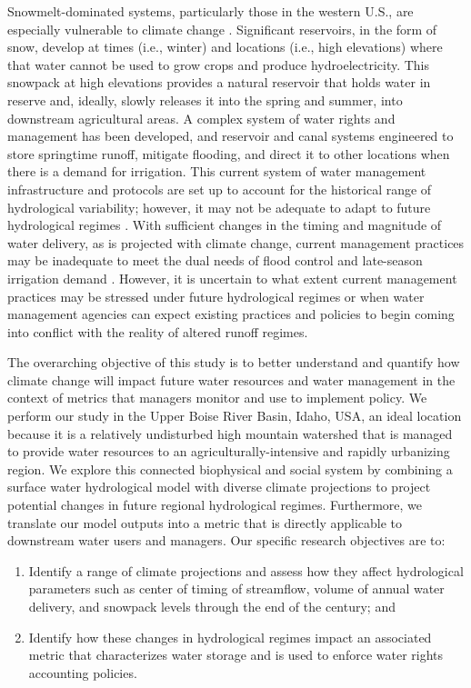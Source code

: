 \documentclass[water,article,submit,moreauthors,pdftex,10pt,a4paper]{mdpi}
\theoremstyle{mdpi}
\newcounter{ex}
\newcounter{re}
\theoremstyle{mdpidefinition}
\begin{document}
Snowmelt-dominated systems, particularly those in the western U.S., are especially vulnerable to climate change \citep{Barnett:2005ci,Stewart:2009jn,Li:2017jn}. Significant reservoirs, in the form of snow, develop at times (i.e., winter) and locations (i.e., high elevations) where that water cannot be used to grow crops and produce hydroelectricity. This snowpack at high elevations provides a natural reservoir that holds water in reserve and, ideally, slowly releases it into the spring and summer, into downstream agricultural areas. A complex system of water rights and management has been developed, and reservoir and canal systems engineered to store springtime runoff, mitigate flooding, and direct it to other locations when there is a demand for irrigation. This current system of water management infrastructure and protocols are set up to account for the historical range of hydrological variability; however, it may not be adequate to adapt to future hydrological regimes \citep{Palmer:2008dv}. With sufficient changes in the timing and magnitude of water delivery, as is projected with climate change, current management practices may be inadequate to meet the dual needs of flood control and late-season irrigation demand \citep{Barnett:2005ci}. However, it is uncertain to what extent current management practices may be stressed under future hydrological regimes or when water management agencies can expect existing practices and policies to begin coming into conflict with the reality of altered runoff regimes. 

The overarching objective of this study is to better understand and quantify how climate change will impact future water resources and water management in the context of metrics that managers monitor and use to implement policy. We perform our study in the Upper Boise River Basin, Idaho, USA, an ideal location because it is a relatively undisturbed high mountain watershed that is managed to provide water resources to an agriculturally-intensive and rapidly urbanizing region. We explore this connected biophysical and social system by combining a surface water hydrological model with diverse climate projections to project potential changes in future regional hydrological regimes. Furthermore, we translate our model outputs into a metric that is directly applicable to downstream water users and managers. Our specific research objectives are to:

\begin{enumerate}
\item Identify a range of climate projections and assess how they affect hydrological parameters such as center of timing of streamflow, volume of annual water delivery, and snowpack levels through the end of the century; and
\item Identify how these changes in hydrological regimes impact an associated metric that characterizes water storage and is used to enforce water rights accounting policies.
\end{enumerate}
\end{document}
